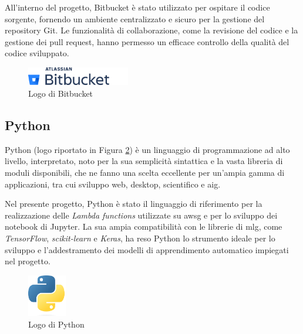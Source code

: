 All'interno del progetto, Bitbucket è stato utilizzato per ospitare il codice sorgente, fornendo un ambiente centralizzato e sicuro per la gestione del repository Git. Le funzionalità di collaborazione, come la revisione del codice e la gestione dei pull request, hanno permesso un efficace controllo della qualità del codice sviluppato.

\begin{figure}[h]
  \centering
  \includegraphics[width=0.4\textwidth]{img/tecnologie/bitbucket.png}
  \caption{Logo di Bitbucket}
  \label{fig:bitbucket}
\end{figure}

\subsection{Python}

Python (logo riportato in Figura \ref{fig:python}) è un linguaggio di programmazione ad alto livello, interpretato, noto per la sua semplicità sintattica e la vasta libreria di moduli disponibili, che ne fanno una scelta eccellente per un'ampia gamma di applicazioni, tra cui sviluppo web, desktop, scientifico e \gls{aig}.

Nel presente progetto, Python è stato il linguaggio di riferimento per la realizzazione delle \textit{Lambda functions} utilizzate su \gls{awsg} e per lo sviluppo dei notebook di Jupyter. La sua ampia compatibilità con le librerie di \gls{mlg}, come \textit{TensorFlow}, \textit{scikit-learn} e \textit{Keras}, ha reso Python lo strumento ideale per lo sviluppo e l'addestramento dei modelli di apprendimento automatico impiegati nel progetto.

\begin{figure}[h]
  \centering
  \includegraphics[width=0.15\textwidth]{img/tecnologie/python.png}
  \caption{Logo di Python}
  \label{fig:python}
\end{figure}
